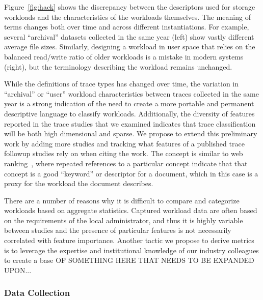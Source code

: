 Figure~\ref{fig:hack} shows the discrepancy between the
descriptors used for storage workloads and the characteristics of the workloads
themselves.  The meaning of terms changes both over time and across different
instantiations.  For example, several ``archival'' datasets collected in the
same year (left)%
show vastly different average file sizes.
Similarly, designing a workload in
user space that relies on the balanced read/write ratio of older workloads is a
mistake in modern systems 
 (right),
but the terminology describing
the workload remains unchanged.

While the definitions of trace types has changed over
time, the variation in ``archival'' or ``user'' workload characteristics between
traces collected in the same year is a strong indication of the need to create a
more portable and permanent descriptive language to classify workloads.
Additionally, the diversity of features reported in the trace studies that we
examined indicates that trace classification will be both high dimensional and
sparse.  
We propose to extend this preliminary work by adding more studies and tracking what
features of a published trace followup studies rely on when citing the work.
The concept is similar to web ranking~\cite{pagerank}, where repeated references
to a particular concept indicate that that concept is a good ``keyword'' or
descriptor for a document, which in this case is a proxy for the workload the
document describes.

There are a number of reasons why it is difficult to compare and categorize
workloads based on aggregate statistics.  Captured workload data are often based
on the requirements of the local administrator, and thus it is highly variable
between studies and the presence of particular features is not necessarily
correlated with feature importance.  Another tactic we propose to derive metrics
is to leverage the expertise and institutional knowledge of our industry colleagues to create a base OF SOMETHING HERE THAT NEEDS TO BE EXPANDED UPON...


\subsubsection*{Data Collection }

